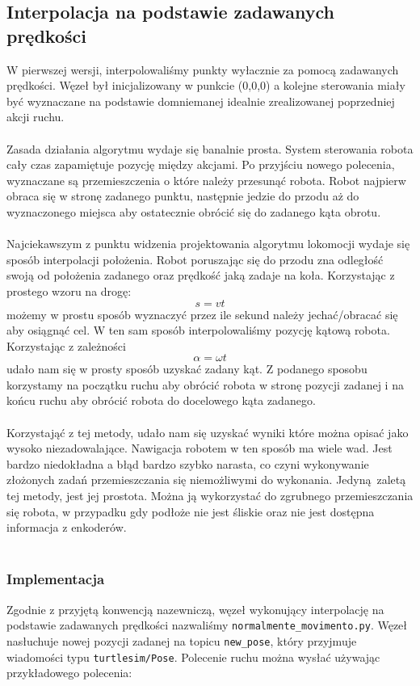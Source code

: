 \documentclass{mwrep}
\begin{document}
\subsection{Interpolacja na podstawie zadawanych prędkości}
W pierwszej wersji, interpolowaliśmy punkty wyłacznie za pomocą 
zadawanych prędkości. Węzeł był inicjalizowany w punkcie (0,0,0) a kolejne sterowania
miały być wyznaczane na podstawie domniemanej idealnie zrealizowanej poprzedniej akcji ruchu.\\
\\
\indent{} Zasada działania algorytmu wydaje się banalnie prosta. System sterowania robota cały 
czas zapamiętuje pozycję między akcjami. Po przyjściu nowego polecenia, wyznaczane są 
przemieszczenia o które należy przesunąć robota. Robot najpierw obraca się w stronę zadanego
punktu, następnie jedzie do przodu aż do wyznaczonego miejsca aby ostatecznie obrócić się do 
zadanego kąta obrotu. \\
\\
\indent{} Najciekawszym z punktu widzenia projektowania algorytmu lokomocji wydaje się sposób interpolacji położenia.
Robot poruszając się do przodu zna odległość swoją od położenia zadanego oraz prędkość jaką zadaje
na koła. Korzystając z prostego wzoru na drogę: $$ s = vt $$ możemy w prostu sposób wyznaczyć
przez ile sekund należy jechać/obracać się aby osiągnąć cel. W ten sam sposób interpolowaliśmy
pozycję kątową robota. Korzystając z zależności $$ \alpha = \omega t $$ udało nam się w prosty
sposób uzyskać zadany kąt. Z podanego sposobu korzystamy na początku ruchu aby obrócić robota w
stronę pozycji zadanej i na końcu ruchu aby obrócić robota do docelowego kąta zadanego. \\
\\
\indent{} Korzystająć z tej metody, udało nam się uzyskać wyniki
które można opisać jako wysoko niezadowalające. Nawigacja robotem w ten sposób ma wiele wad.
Jest bardzo niedokładna a błąd bardzo szybko narasta, co czyni wykonywanie złożonych zadań
przemieszczania się niemożliwymi do wykonania. Jedyną zaletą tej metody, jest jej prostota.
Można ją wykorzystać do zgrubnego przemieszczania się robota, w przypadku gdy podłoże 
nie jest śliskie oraz nie jest dostępna informacja z enkoderów.\\
\\
\subsubsection{Implementacja}
Zgodnie z przyjętą konwencją nazewniczą, węzeł wykonujący interpolację na podstawie 
zadawanych prędkości nazwaliśmy \texttt{normalmente\_{}movimento.py}. Węzeł nasłuchuje 
nowej pozycji zadanej na topicu \texttt{new\_{}pose}, który przyjmuje wiadomości
typu \texttt{turtlesim/Pose}. Polecenie ruchu można wysłać używając przykładowego polecenia:
\end{document}

